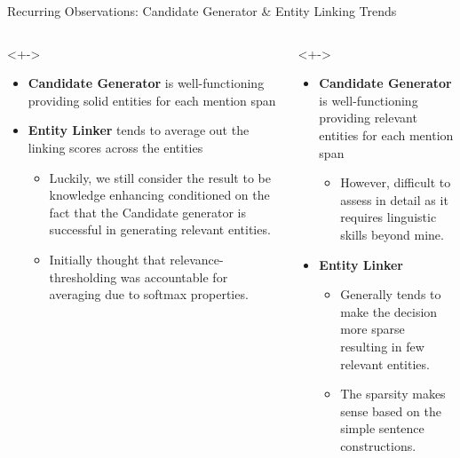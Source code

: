 \begin{frame}{Recurring Observations: Candidate Generator \& Entity Linking Trends}
\footnotesize
\begin{columns}
\begin{column}[T]{0.5\textwidth}<+->
\begin{itemize}
    \item \textbf{Candidate Generator} is well-functioning providing solid entities for each mention span \\
    \item \textbf{Entity Linker} tends to average out the linking scores across the entities
    \begin{itemize}
        \item Luckily, we still consider the result to be knowledge enhancing conditioned on the fact that the Candidate generator is successful in generating relevant entities.
        \item Initially thought that relevance-thresholding was accountable for averaging due to softmax properties.
    \end{itemize}
\end{itemize}
\end{column}
\begin{column}[T]{0.5\textwidth}<+->
\begin{itemize}
    \item \textbf{Candidate Generator} is well-functioning providing relevant entities for each mention span \\
    \begin{itemize}
        \item However, difficult to assess in detail as it requires linguistic skills beyond mine.
    \end{itemize}
    \item \textbf{Entity Linker}
    \begin{itemize}
        \item Generally tends to make the decision more sparse resulting in few relevant entities. \\
        \item The sparsity makes sense based on the simple sentence constructions. 
    \end{itemize}
\end{itemize}
\end{column}
\end{columns}
\end{frame}

